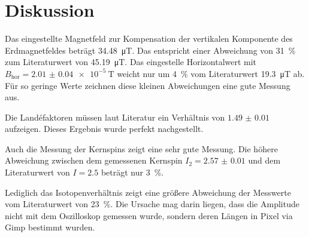 \section{Diskussion}
\label{sec:Diskussion}
Das eingestellte Magnetfeld zur Kompensation der vertikalen Komponente des Erdmagnetfeldes beträgt \SI{34.48}{\micro\tesla}.
Das entspricht einer Abweichung von \SI{31}{\percent} zum Literaturwert \cite{noaa} von \SI{45.19}{\micro\tesla}.
Das eingestelle Horizontalwert mit $B_{\text{hor}}=\SI{2.01(4)e-5}{\tesla}$ weicht nur um \SI{4}{\percent} vom Literaturwert \SI{19.3}{\micro\tesla} ab.
Für so geringe Werte zeichnen diese kleinen Abweichungen eine gute Messung aus.

Die Landéfaktoren müssen laut Literatur \cite{wang} ein Verhältnis von $\num{1.49(1)}$ aufzeigen.
Dieses Ergebnis wurde perfekt nachgestellt.

Auch die Messung der Kernspins zeigt eine sehr gute Messung.
Die höhere Abweichung zwischen dem gemessenen Kernspin $I_2=\num{2.57(1)}$ und dem Literaturwert von $I=\num{2.5}$ beträgt nur \SI{3}{\percent}.

Lediglich das Isotopenverhältnis zeigt eine größere Abweichung der Messwerte vom Literaturwert von \SI{23}{\percent}.
Die Ursache mag darin liegen, dass die Amplitude nicht mit dem Oszilloskop gemessen wurde, sondern deren Längen in Pixel via Gimp bestimmt wurden.